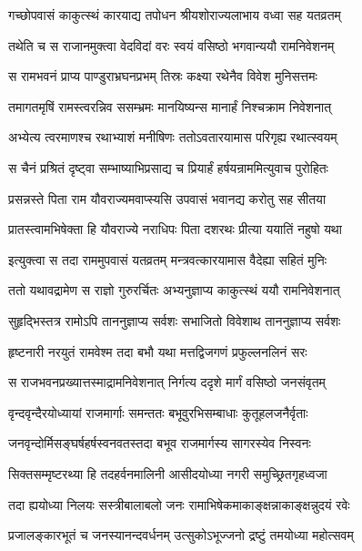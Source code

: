 \twolineshloka
{गच्छोपवासं काकुत्स्थं कारयाद्य तपोधन}
{श्रीयशोराज्यलाभाय वध्वा सह यतव्रतम्} %

\twolineshloka
{तथेति च स राजानमुक्त्वा वेदविदां वरः}
{स्वयं वसिष्ठो भगवान्ययौ रामनिवेशनम्} %

\twolineshloka
{स रामभवनं प्राप्य पाण्डुराभ्रघनप्रभम्}
{तिस्रः कक्ष्या रथेनैव विवेश मुनिसत्तमः} %

\twolineshloka
{तमागतमृषिं रामस्त्वरन्निव ससम्भ्रमः}
{मानयिष्यन्स मानार्हं निश्चक्राम निवेशनात्} %

\twolineshloka
{अभ्येत्य त्वरमाणश्च रथाभ्याशं मनीषिणः}
{ततोऽवतारयामास परिगृह्य रथात्स्वयम्} %

\twolineshloka
{स चैनं प्रश्रितं दृष्ट्वा सम्भाष्याभिप्रसाद्य च}
{प्रियार्हं हर्षयन्राममित्युवाच पुरोहितः} %

\twolineshloka
{प्रसन्नस्ते पिता राम यौवराज्यमवाप्स्यसि}
{उपवासं भवानद्य करोतु सह सीतया} %

\twolineshloka
{प्रातस्त्वामभिषेक्ता हि यौवराज्ये नराधिपः}
{पिता दशरथः प्रीत्या ययातिं नहुषो यथा} %

\twolineshloka
{इत्युक्त्वा स तदा राममुपवासं यतव्रतम्}
{मन्त्रवत्कारयामास वैदेह्या सहितं मुनिः} %

\twolineshloka
{ततो यथावद्रामेण स राज्ञो गुरुरर्चितः}
{अभ्यनुज्ञाप्य काकुत्स्थं ययौ रामनिवेशनात्} %

\twolineshloka
{सुहृद्भिस्तत्र रामोऽपि ताननुज्ञाप्य सर्वशः}
{सभाजितो विवेशाथ ताननुज्ञाप्य सर्वशः} %

\twolineshloka
{हृष्टनारी नरयुतं रामवेश्म तदा बभौ}
{यथा मत्तद्विजगणं प्रफुल्लनलिनं सरः} %

\twolineshloka
{स राजभवनप्रख्यात्तस्माद्रामनिवेशनात्}
{निर्गत्य ददृशे मार्गं वसिष्ठो जनसंवृतम्} %

\twolineshloka
{वृन्दवृन्दैरयोध्यायां राजमार्गाः समन्ततः}
{बभूवुरभिसम्बाधाः कुतूहलजनैर्वृताः} %

\twolineshloka
{जनवृन्दोर्मिसङ्घर्षहर्षस्वनवतस्तदा}
{बभूव राजमार्गस्य सागरस्येव निस्वनः} %

\twolineshloka
{सिक्तसम्मृष्टरथ्या हि तदहर्वनमालिनी}
{आसीदयोध्या नगरी समुच्छ्रितगृहध्वजा} %

\twolineshloka
{तदा ह्ययोध्या निलयः सस्त्रीबालाबलो जनः}
{रामाभिषेकमाकाङ्क्षन्नाकाङ्क्षन्नुदयं रवेः} %

\twolineshloka
{प्रजालङ्कारभूतं च जनस्यानन्दवर्धनम्}
{उत्सुकोऽभूज्जनो द्रष्टुं तमयोध्या महोत्सवम्} %

